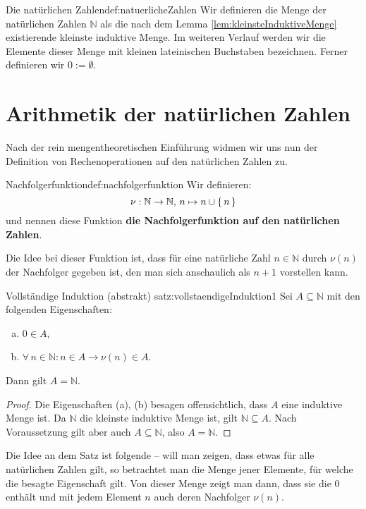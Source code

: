 \documentclass{article}
\begin{document}
\begin{definition}{Die nat\"urlichen Zahlen}{def:natuerlicheZahlen}
Wir definieren die Menge der nat\"urlichen Zahlen $\mathbb{N}$ als die nach dem
Lemma \ref{lem:kleinsteInduktiveMenge} existierende kleinste induktive Menge.
Im weiteren Verlauf werden wir die Elemente dieser Menge mit kleinen
lateinischen Buchstaben bezeichnen. Ferner definieren wir $0 := \emptyset$.
\end{definition}

\section{Arithmetik der nat\"urlichen Zahlen}

Nach der rein mengentheoretischen Einf\"uhrung widmen wir uns nun der
Definition von Rechenoperationen auf den nat\"urlichen Zahlen zu.

\begin{definition}{Nachfolgerfunktion}{def:nachfolgerfunktion}
Wir definieren:
\[\nu : \mathbb{N} \to \mathbb{N}, \, n \mapsto n \cup \set{n}\]
und nennen diese Funktion \textbf{die Nachfolgerfunktion auf den nat\"urlichen
Zahlen}.
\end{definition}

Die Idee bei dieser Funktion ist, dass f\"ur eine nat\"urliche Zahl $n \in
\mathbb{N}$ durch $\nu(n)$ der Nachfolger gegeben ist, den man sich anschaulich
als $n + 1$ vorstellen kann.

\begin{theorem}{Vollst\"andige Induktion (abstrakt)}
               {satz:vollstaendigeInduktion1}
Sei $A \subseteq \mathbb{N}$ mit den folgenden Eigenschaften:
\begin{enumerate}[(a)]
    \item $0 \in A$,
    \item $\forall\, n \in \mathbb{N}: n \in A \rightarrow \nu(n) \in A$.
\end{enumerate}
Dann gilt $A = \mathbb{N}$.
\end{theorem}
\begin{proof}
Die Eigenschaften (a), (b) besagen offensichtlich, dass $A$ eine induktive
Menge ist. Da $\mathbb{N}$ die kleinste induktive Menge ist, gilt $\mathbb{N}
\subseteq A$. Nach Voraussetzung gilt aber auch $A \subseteq \mathbb{N}$, also
$A = \mathbb{N}$.
\end{proof}

Die Idee an dem Satz ist folgende -- will man zeigen, dass etwas f\"ur alle
nat\"urlichen Zahlen gilt, so betrachtet man die Menge jener Elemente, f\"ur
welche die besagte Eigenschaft gilt. Von dieser Menge zeigt man dann, dass sie
die $0$ enth\"alt und mit jedem Element $n$ auch deren Nachfolger $\nu(n)$.
\end{document}
